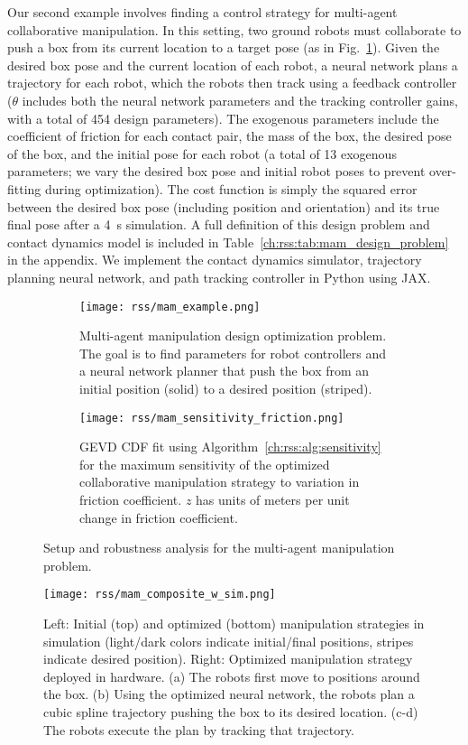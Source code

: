 Our second example involves finding a control strategy for multi-agent collaborative manipulation. In this setting, two ground robots must collaborate to push a box from its current location to a target pose (as in Fig.~\ref{ch:rss:fig:mam_example}). Given the desired box pose and the current location of each robot, a neural network plans a trajectory for each robot, which the robots then track using a feedback controller ($\theta$ includes both the neural network parameters and the tracking controller gains, with a total of 454 design parameters). The exogenous parameters include the coefficient of friction for each contact pair, the mass of the box, the desired pose of the box, and the initial pose for each robot (a total of 13 exogenous parameters; we vary the desired box pose and initial robot poses to prevent over-fitting during optimization). The cost function is simply the squared error between the desired box pose (including position and orientation) and its true final pose after a \SI{4}{s} simulation. A full definition of this design problem and contact dynamics model is included in Table~\ref{ch:rss:tab:mam_design_problem} in the appendix. We implement the contact dynamics simulator, trajectory planning neural network, and path tracking controller in Python using JAX.

\begin{figure}[tb]
	\centering
	\begin{subfigure}[c]{0.45\linewidth}
		\centering
		\texttt{[image: rss/mam\_example.png]}
		\caption{Multi-agent manipulation design optimization problem. The goal is to find parameters for robot controllers and a neural network planner that push the box from an initial position (solid) to a desired position (striped).}
		\label{ch:rss:fig:mam_example}
	\end{subfigure}
	\quad
	\begin{subfigure}[c]{0.45\linewidth}
		\centering
		\texttt{[image: rss/mam\_sensitivity\_friction.png]}
		\caption{GEVD CDF fit using Algorithm~\ref{ch:rss:alg:sensitivity} for the maximum sensitivity of the optimized collaborative manipulation strategy to variation in friction coefficient. $z$ has units of meters per unit change in friction coefficient.}
		\label{ch:rss:fig:mam_gevd}
	\end{subfigure}
	\caption{Setup and robustness analysis for the multi-agent manipulation problem.}
\end{figure}

\begin{figure}[tb]
	\centering
	\texttt{[image: rss/mam\_composite\_w\_sim.png]}
	\caption{Left: Initial (top) and optimized (bottom) manipulation strategies in simulation (light/dark colors indicate initial/final positions, stripes indicate desired position). Right: Optimized manipulation strategy deployed in hardware. (a) The robots first move to positions around the box. (b) Using the optimized neural network, the robots plan a cubic spline trajectory pushing the box to its desired location. (c-d) The robots execute the plan by tracking that trajectory.}
	\label{ch:rss:fig:mam_hw}
\end{figure}



